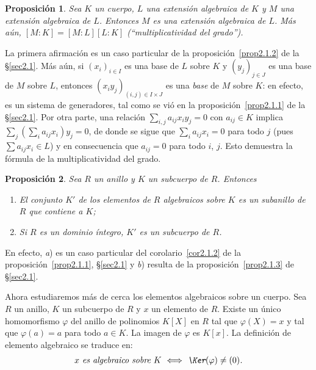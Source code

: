 \documentclass[bibtotoc,leqno,spanish]{amsbook}
\numberwithin{equation}{section}
\theoremstyle{note}
\theoremstyle{note}
\newtheorem{proposition}{Proposici\'on}
\theoremstyle{rem}
\numberwithin{theorem}{section}
\numberwithin{proposition}{section}
\numberwithin{definition}{section}
\numberwithin{lemma}{section}
\numberwithin{corollary}{section}
\numberwithin{example}{section}
\numberwithin{footnote}{section}%
\begin{document}
\begin{proposition}\label{prop2.3.1}
Sea $K$ un cuerpo, $L$ una extensi\'on algebraica de $K$ y $M$ una extensi\'on algebraica de $L$. Entonces
$M$ es una extensi\'on algebraica de $L$. M\'as a\'un, $[M:K] = [M:L][L:K]$
(``multiplicatividad del grado'').
\end{proposition}

La primera afirmaci\'on es un caso particular de la proposici\'on~\ref{prop2.1.2} de la \S\ref{sec2.1}.
M\'as a\'un, si $(x_{i})_{i\in I}$
es una base de $L$ sobre $K$ y $(y_{j})_{j\in J}$ es una base de $M$ sobre $L$, entonces $(x_{i}y_{j})_{(i,j)\in I\times J}$
es una {\em base} de $M$ sobre $K$: en efecto, es un sistema de generadores, tal como se vi\'o en la
proposici\'on~\ref{prop2.1.1} de la \S\ref{sec2.1}.
Por otra parte, una relaci\'on $\sum_{i,j}a_{ij}x_{i}y_{j} = 0$ con $a_{ij}\in K$ implica
$\sum_{j}\left(\sum_{i}a_{ij}x_{i}\right)y_{j} = 0$, de donde se sigue que
$\sum_{i}a_{ij}x_{i} = 0$ para todo $j$ (pues
$\sum a_{ij}x_{i}\in L$) y en consecuencia que $a_{ij} = 0$ para todo $i$, $j$. Esto demuestra la f\'ormula
de la multiplicatividad del grado.

\begin{proposition}
Sea $R$ un anillo y $K$ un subcuerpo de $R$. Entonces
\begin{enumerate}
\item[\upshape a)] El conjunto $K'$ de los elementos de $R$ algebraicos sobre $K$ es un subanillo de $R$ que contiene a $K$;
\item[\upshape b)] Si $R$ es un dominio \'integro, $K'$ es un subcuerpo de $R$.
\end{enumerate}
\end{proposition}

En efecto, {\itshape a}) es un caso particular del corolario~\ref{cor2.1.2} de la proposici\'on~\ref{prop2.1.1}, \S\ref{sec2.1}
y {\itshape b}) resulta de la proposici\'on~\ref{prop2.1.3} de \S\ref{sec2.1}.

Ahora estudiaremos m\'as de cerca los elementos algebraicos sobre un cuerpo. Sea $R$ un anillo, $K$ un subcuerpo
de $R$ y $x$ un elemento de $R$. Existe un \'unico homomorfismo $\varphi$ del anillo de polinomios $K[X]$ en
$R$ tal que $\varphi(X) = x$ y tal que $\varphi(a) = a$ para todo $a\in K$. La imagen de $\varphi$ es $K[x]$.
La definici\'on de elemento algebraico se traduce en:
\begin{gather}\label{eq-2.3-4}
\text{\itshape $x$ es algebraico sobre $K$ $\iff$ $\Ker(\varphi)\neq(0)$.}
\end{gather}
\end{document}
